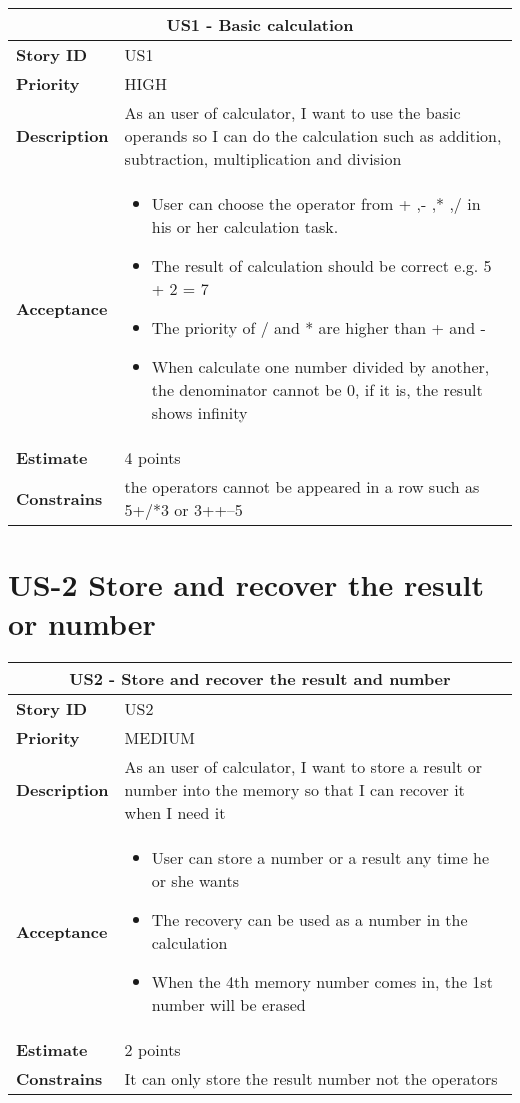 \documentclass[12pt]{report}
\begin{document}
{		\begin{tabular}{ |p{4cm}|p{10cm}| }
			\hline
			\multicolumn{2}{|c|}{US1 - Basic calculation} \\
			\hline
			\textbf {Story ID}& US1 \\
			\hline
			\textbf{Priority} & HIGH \\
			\hline
			\textbf{Description}   & As an user of calculator, I want to use the basic operands so I can do the calculation such as addition, subtraction, multiplication and division  \\
			\hline
			\textbf{Acceptance}& 
			\begin{itemize}
				\item User can choose the operator from + ,- ,* ,/ in his or her calculation task.
				\item The result of calculation should be correct e.g. 5 + 2 = 7
				\item The priority of / and * are higher than + and -
				\item When calculate one number divided by another, the denominator cannot be 0, if it is, the result shows infinity 
			\end{itemize}
			\\
			\hline
			\textbf{Estimate} & 4 points \\
			\hline
			\textbf{Constrains}& the operators cannot be appeared in a row such as 5+/*3 or 3++--5 \\
			\hline
		\end{tabular}
		
		
		\section{US-2 Store and recover the result or number}
		\begin{tabular}{ |p{4cm}|p{10cm}| }
			\hline
			\multicolumn{2}{|c|}{US2 - Store and recover the result and number } \\
			\hline
			\textbf {Story ID}& US2 \\
			\hline
			\textbf{Priority} & MEDIUM \\
			\hline
			\textbf{Description}   & As an user of calculator, I want to  store a result or number into the memory so that I can recover it when I need it \\
			\hline
			\textbf{Acceptance}&
			\begin{itemize}
				\item User can store a number or a result any time he or she wants
				\item The recovery can be used as a number in the calculation
				\item When the 4th memory number comes in, the 1st number will be erased 
			\end{itemize}
			\\
			\hline
			\textbf{Estimate} & 2 points\\
			\hline
			\textbf{Constrains}& It can only store the result number not the operators  \\
			\hline
		\end{tabular}
		
}
\end{document}

